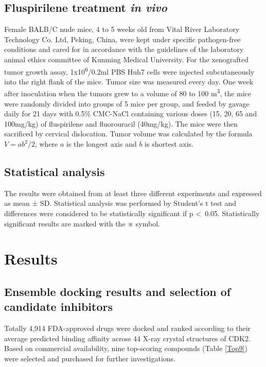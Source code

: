 \documentclass[10pt]{article}
\begin{document}
\subsection*{Fluspirilene treatment \textit{in vivo}}

Female BALB/C nude mice, 4 to 5 weeks old from Vital River Laboratory Technology Co. Ltd, Peking, China, were kept under specific pathogen-free conditions and cared for in accordance with the guidelines of the laboratory animal ethics committee of Kunming Medical University. For the xenografted tumor growth assay, 1x10\textsuperscript{6}/0.2ml PBS Huh7 cells were injected subcutaneously into the right flank of the mice. Tumor size was measured every day. One week after inoculation when the tumors grew to a volume of 80 to 100 m\textsuperscript{3}, the mice were randomly divided into groups of 5 mice per group, and feeded by gavage daily for 21 days with 0.5\% CMC-NaCl containing various doses (15, 20, 65 and 100mg/kg) of fluspirilene and fluorouracil (40mg/kg). The mice were then sacrificed by cervical dislocation. Tumor volume was calculated by the formula $V=ab^2/2$, where $a$ is the longest axis and $b$ is shortest axis.

\subsection*{Statistical analysis}

The results were obtained from at least three different experiments and expressed as mean ± SD. Statistical analysis was performed by Student’s t test and differences were considered to be statistically significant if p \textless\ 0.05. Statistically significant results are marked with the ※ symbol.

\section*{Results}

\subsection*{Ensemble docking results and selection of candidate inhibitors}

Totally 4,914 FDA-approved drugs were docked and ranked according to their average predicted binding affinity across 44 X-ray crystal structures of CDK2. Based on commercial availability, nine top-scoring compounds (Table \ref{Top9}) were selected and purchased for further investigations.
\end{document}
